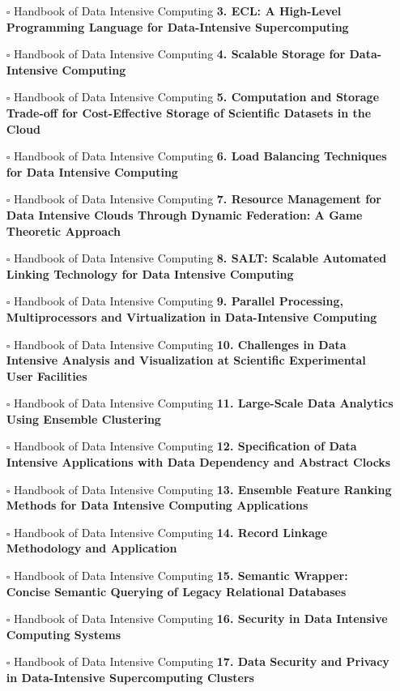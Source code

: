 \documentclass[a4, landscape, 12pt]{article}
\newcommand{\checkbox}{$\square$}%
\begin{document}
\begin{itemize}
{}
\item [\checkbox]  Handbook of Data Intensive Computing \textbf{ 3. ECL: A High-Level Programming Language for Data-Intensive Supercomputing
}
\item [\checkbox]  Handbook of Data Intensive Computing \textbf{ 4. Scalable Storage for Data-Intensive Computing
}
\item [\checkbox]  Handbook of Data Intensive Computing \textbf{ 5. Computation and Storage Trade-off for Cost-Effective Storage of Scientific Datasets in the Cloud
}
\item [\checkbox]  Handbook of Data Intensive Computing \textbf{ 6. Load Balancing Techniques for Data Intensive Computing
}
\item [\checkbox]  Handbook of Data Intensive Computing \textbf{ 7. Resource Management for Data Intensive Clouds Through Dynamic Federation: A Game Theoretic Approach
}
\item [\checkbox]  Handbook of Data Intensive Computing \textbf{ 8. SALT: Scalable Automated Linking Technology for Data Intensive Computing
}
\item [\checkbox]  Handbook of Data Intensive Computing \textbf{ 9. Parallel Processing, Multiprocessors and Virtualization in Data-Intensive Computing
}
\item [\checkbox]  Handbook of Data Intensive Computing \textbf{ 10. Challenges in Data Intensive Analysis and Visualization at Scientific Experimental User Facilities
}
\item [\checkbox]  Handbook of Data Intensive Computing \textbf{ 11. Large-Scale Data Analytics Using Ensemble Clustering
}
\item [\checkbox]  Handbook of Data Intensive Computing \textbf{ 12. Specification of Data Intensive Applications with Data Dependency and Abstract Clocks
}
\item [\checkbox]  Handbook of Data Intensive Computing \textbf{ 13. Ensemble Feature Ranking Methods for Data Intensive Computing Applications
}
\item [\checkbox]  Handbook of Data Intensive Computing \textbf{ 14. Record Linkage Methodology and Application
}
\item [\checkbox]  Handbook of Data Intensive Computing \textbf{ 15. Semantic Wrapper: Concise Semantic Querying of Legacy Relational Databases
}
\item [\checkbox]  Handbook of Data Intensive Computing \textbf{ 16. Security in Data Intensive Computing Systems
}
\item [\checkbox]  Handbook of Data Intensive Computing \textbf{ 17. Data Security and Privacy in Data-Intensive Supercomputing Clusters
}
\end{itemize}
\end{document}
